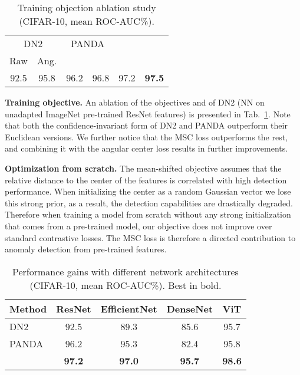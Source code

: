 \documentclass[letterpaper]{article} \usepackage{aaai23}  \usepackage{times}  \usepackage{helvet}  \usepackage{courier}  \usepackage[hyphens]{url}  \usepackage{graphicx} \usepackage{amsmath, amssymb}
\begin{document}
\begin{table}[t]
  \centering
  \begin{tabular}{cccccc}

\multicolumn{2}{c}{DN2}	&	\multicolumn{2}{c}{PANDA} 	&		&			\\
\cmidrule(r){1-2}\cmidrule(r){3-4}\cmidrule(r){5-5}\cmidrule(r){6-6}
Raw & Ang. &  &  & & \\
\midrule
92.5	&	95.8	&	96.2	& 96.8  &	 97.2	&	\textbf{97.5}		\\											
    \bottomrule
  \end{tabular}
    \caption{Training objection ablation study (CIFAR-10, mean ROC-AUC\%).}
    \label{tab:ablation}
\end{table}

\textbf{Training objective.} An ablation of the objectives and of DN2 (NN on unadapted ImageNet pre-trained ResNet features) is presented in Tab.~\ref{tab:ablation}. Note that both the confidence-invariant form of DN2 and PANDA outperform their Euclidean versions. We further notice that the MSC loss outperforms the rest, and combining it with the angular center loss results in further improvements.

\textbf{Optimization from scratch.} The mean-shifted objective assumes that the relative distance to the center of the features is correlated with high detection performance. When initializing the center as a random Gaussian vector we lose this strong prior, as a result, the detection capabilities are drastically degraded. Therefore when training a model from scratch without any strong initialization that comes from a pre-trained model, our objective does not improve over standard contrastive losses. The MSC loss is therefore a directed contribution to anomaly detection from pre-trained features.

\begin{table}[t]
  \centering
  \begin{tabular}{lcccc}
    \toprule

Method 	&	ResNet &  EfficientNet	& DenseNet & ViT \\
\midrule
DN2
	&	92.5	& 89.3 &	 85.6 & 95.7	\\
PANDA
	&	96.2	&	95.3 & 82.4 & 95.8	\\	

	&	\textbf{97.2}	& \textbf{97.0}	 & \textbf{95.7} & \textbf{98.6}	\\	
    \bottomrule
  \end{tabular}
    \caption{Performance gains with different network architectures (CIFAR-10, mean ROC-AUC\%). Best in bold.}
    \label{tab:arc}
\end{table}
\end{document}
